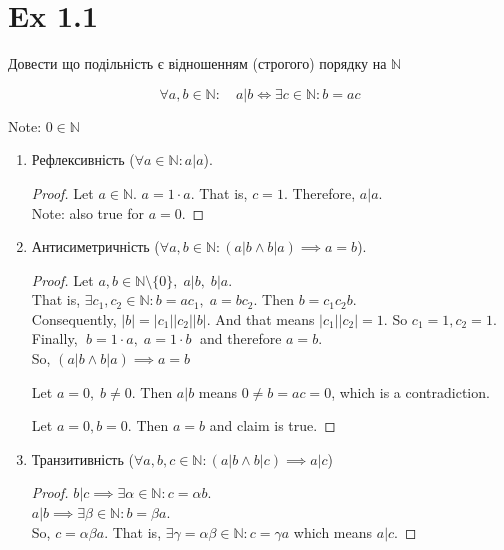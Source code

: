 \documentclass[11pt, a4paper]{article} %
\newcommand{\N}{\mathbb{N}}
\begin{document}
\section*{Ex 1.1}
\begin{mdframed}
    Довести що подільність є відношенням (строгого) порядку на $\N$
\end{mdframed}

\begin{mdframed}[backgroundcolor=blue!10]
    \[\forall a,b \in \N: \quad a|b \iff \exists c\in \N: b=ac \]
\end{mdframed}

Note: $0 \in \N$

\begin{enumerate}
    \item Рефлексивність ($\forall a\in\N: a|a$).
    \begin{proof}
    Let $a\in\N$. $a = 1\cdot a$. That is, $c = 1$. Therefore, $a|a$.\\
    Note: also true for $a=0$.
    \end{proof}

    \item Антисиметричність ($\forall a,b\in\N : (a|b \land b|a) \implies a=b$).
    \begin{proof}
    Let $a,b\in \N\setminus\{0\},  \; a|b,\; b|a$. \\
    That is, $\exists c_1,c_2\in\N : b = ac_1, \; a = bc_2$. Then $b = c_1c_2b$. \\
    Consequently, $|b| = |c_1||c_2||b|$. And that means $|c_1||c_2|=1$. So $c_1 = 1, c_2 = 1$.\\
    Finally, $\;b = 1 \cdot a, \; a = 1 \cdot b\;$ and therefore $a=b$. \\
    So, $(a|b \land b|a) \implies a=b$

    Let $a = 0, \; b\ne 0$. Then $a|b$ means $0\ne b = ac = 0$, which is a contradiction.

    Let $a=0, b=0$. Then $a=b$ and claim is true.

    \end{proof}

    \item Транзитивність ($\forall a,b,c\in\N : (a|b \land b|c)\implies a|c$)
    \begin{proof}
        $b|c \implies \exists \alpha \in \N: c = \alpha b$.\\
        $a|b \implies \exists \beta \in \N: b = \beta a$.\\
        So, $c = \alpha\beta a$. That is, $\exists \gamma = \alpha\beta \in \N: c = \gamma a$
        which means $a|c$.
    \end{proof}
\end{enumerate}
\end{document}
